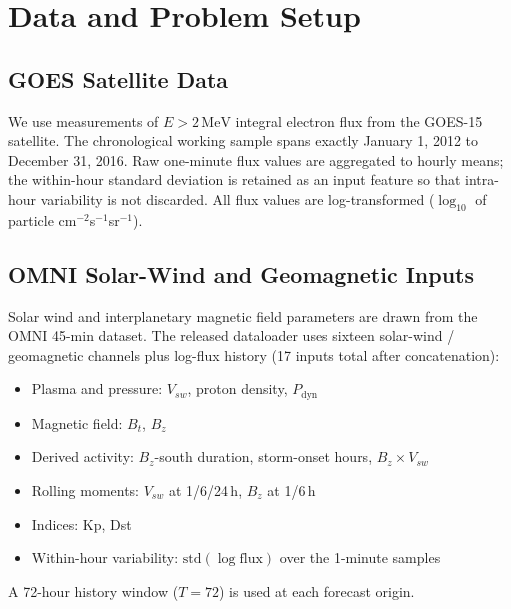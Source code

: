 ﻿\documentclass{ieeeaccess}
\begin{document}
\section{Data and Problem Setup}
\label{sec:data}

\subsection{GOES Satellite Data}
We use measurements of \(E>2\,\mathrm{MeV}\) integral electron flux from the
GOES-15 satellite. The chronological working sample spans exactly January 1, 2012
to December 31, 2016. Raw one-minute flux values are aggregated to hourly means;
the within-hour standard deviation is retained as an input feature so that
intra-hour variability is not discarded. All flux values are log-transformed
(\(\log_{10}\) of particle cm\(^{-2}\)s\(^{-1}\)sr\(^{-1}\)).

\subsection{OMNI Solar-Wind and Geomagnetic Inputs}
Solar wind and interplanetary magnetic field parameters are drawn from the OMNI
45-min dataset. The released dataloader uses sixteen solar-wind / geomagnetic channels plus log-flux history (17 inputs total after concatenation):
\begin{itemize}
\item Plasma and pressure: \(V_{sw}\), proton density, \(P_{\mathrm{dyn}}\)
\item Magnetic field: \(B_t\), \(B_z\)
\item Derived activity: \(B_z\)-south duration, storm-onset hours, \(B_z\times V_{sw}\)
\item Rolling moments: \(V_{sw}\) at 1/6/24\,h, \(B_z\) at 1/6\,h
\item Indices: Kp, Dst
\item Within-hour variability: \(\mathrm{std}(\log\mathrm{flux})\) over the 1-minute samples
\end{itemize}
A 72-hour history window (\(T=72\)) is used at each forecast origin.
\end{document}

